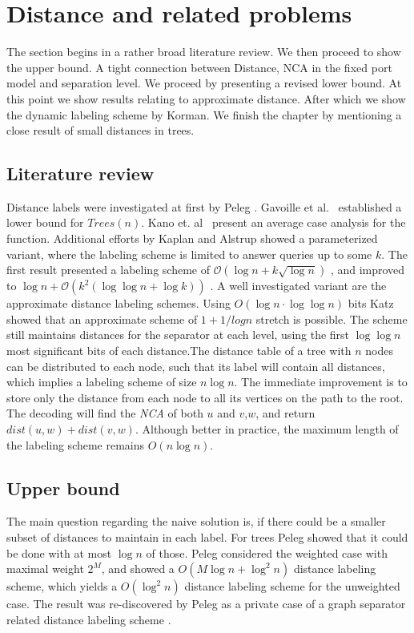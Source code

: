 \newpage
\section{Distance and related problems} \label{section:distance}
	The section begins in a rather broad literature review. 
	We then proceed to show the upper bound.
	A tight  connection between Distance, NCA in the fixed port model and separation level.
	We proceed by presenting  a revised lower bound.
	At this point we show results relating to approximate distance.
	After which we  show the dynamic labeling scheme by Korman.
	We finish the chapter by mentioning a close result of small distances in trees.
	
\subsection{Literature review}
	Distance labels were investigated at first by Peleg \cite{Peleg00}.
	Gavoille et al.~\cite{gavoillea2004distance,Gavoille2001} established a lower bound for $Trees(n)$.
		 Kano et. al~\cite{Kano07} present an average case analysis  for the function.
		Additional efforts by Kaplan \cite{Kaplan01} and Alstrup \cite{Alstrup05} showed a parameterized variant, where  the labeling scheme is limited to answer queries  up to some $k$. The first result presented a labeling scheme of  $\mathcal{O}(\log n + k \sqrt{\log n})$  \cite{Kaplan01}, and  improved  to $\log n+\mathcal{O}(k^2(\log \log n + \log k))$ \cite{Alstrup05}.	
		A well investigated variant are the approximate distance labeling schemes.
		Using $O(\log n \cdot \log \log n)$ bits Katz showed that an approximate scheme of $1+1 / log n$ stretch is possible.  The scheme still maintains distances for the separator at each level, using the first $\log \log n$ most significant bits \cite{Katz00} of each distance.The distance table of a tree with $n$ nodes can be distributed to each node, such that its label will contain all distances, which implies a labeling scheme of size $n \log n$.
		The immediate improvement is to store only the distance from each node to all its vertices on the path to the root. 
		The decoding will find the \emph{NCA} of both $u$ and $v$,$w$, and return $dist(u,w)+dist(v,w)$.
		Although better in practice, the maximum length of the labeling scheme remains $O(n \log n)$.
\subsection{Upper bound}
		The main question regarding the naive solution is, if there could be a smaller subset of distances to maintain in each label.
		For trees Peleg showed that it could be done with at most $\log n$ of those.
		Peleg considered  the weighted case with maximal weight $2^M$, and showed a  $O(M \log n + \log^2 n)$  distance labeling scheme, which yields a  $O(\log^2 n)$  distance labeling scheme for the unweighted case.		
		The result was re-discovered by Peleg as a private case of a graph separator related distance labeling scheme \cite{Gavoille2001}.
		
